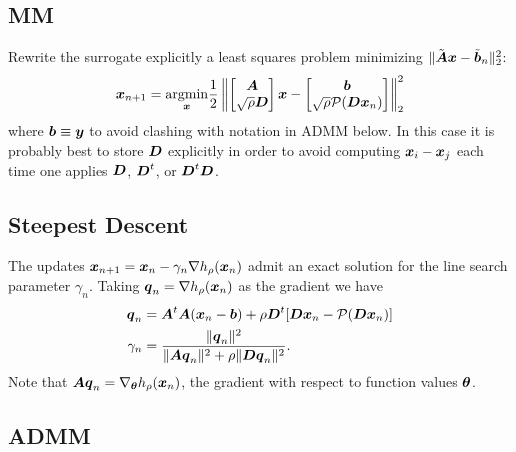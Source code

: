 \documentclass{article}
\begin{document}
\subsection*{MM}
Rewrite the surrogate explicitly a least squares problem minimizing $\|\tilde{\boldsymbol{A}} \boldsymbol{x} - \tilde{\boldsymbol{b}}_{n}\|^{2}_{2}$:
\begin{equation*}
  \boldsymbol{x}_{n+1} = \underset{\boldsymbol{x}}{\mathop{\rm argmin}\nolimits} \frac{1}{2} \left\|
    \begin{bmatrix}
      \boldsymbol{A} \\
      \sqrt{\rho} \boldsymbol{D}
    \end{bmatrix} \boldsymbol{x}
    -
    \begin{bmatrix}
      \boldsymbol{b} \\
      \sqrt{\rho} \mathcal{P}(\boldsymbol{D} \boldsymbol{x}_{n})
    \end{bmatrix}
  \right\|_{2}^{2}
\end{equation*}
where $\boldsymbol{b} \equiv \boldsymbol{y}$ to avoid clashing with notation in ADMM below.
In this case it is probably best to store $\boldsymbol{D}$ explicitly in order to avoid computing $\boldsymbol{x}_{i} - \boldsymbol{x}_{j}$ each time one applies $\boldsymbol{D}$, $\boldsymbol{D}^{t}$, or $\boldsymbol{D}^{t} \boldsymbol{D}$.

\subsection*{Steepest Descent}

The updates $\boldsymbol{x}_{n+1} = \boldsymbol{x}_{n} - \gamma_{n} \nabla h_{\rho}(\boldsymbol{x}_{n})$ admit an exact solution for the line search parameter $\gamma_{n}$.
Taking $\boldsymbol{q}_{n} = \nabla h_{\rho}(\boldsymbol{x}_{n})$ as the gradient we have
\begin{align*}
  \boldsymbol{q}_{n}
  &= \boldsymbol{A}^{t} \boldsymbol{A}(\boldsymbol{x}_{n} - \boldsymbol{b}) + \rho \boldsymbol{D}^{t} [\boldsymbol{D} \boldsymbol{x}_{n} - \mathcal{P}(\boldsymbol{D} \boldsymbol{x}_{n})] \\
  \gamma_{n}
  &=
  \frac{\|\boldsymbol{q}_{n}\|^{2}}{\|\boldsymbol{A} \boldsymbol{q}_{n}\|^{2} + \rho \|\boldsymbol{D} \boldsymbol{q}_{n}\|^{2}}.
\end{align*}
Note that $\boldsymbol{A} \boldsymbol{q}_{n} = \nabla_{\boldsymbol{\theta}} h_{\rho}(\boldsymbol{x}_{n})$, the gradient with respect to function values $\boldsymbol{\theta}$.

\subsection*{ADMM}
\end{document}
